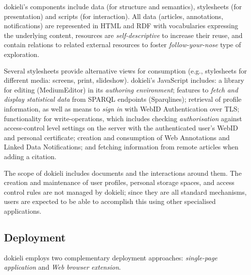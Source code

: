 \documentclass[a4paper]{llncs}
\begin{document}
                                
                                    
\par dokieli’s components include data (for structure and semantics), stylesheets (for presentation) and scripts (for interaction). All data (articles, annotations, notifications) are represented in HTML and RDF with vocabularies expressing the underlying content, resources are {\em self-descriptive} to increase their reuse, and contain relations to related external resources to foster {\em follow-your-nose} type of exploration.

                                    
\par Several stylesheets provide alternative views for consumption (e.g., stylesheets for different media: screens, print, slideshow). dokieli’s JavaScript includes: a library for editing (\empty MediumEditor) in its {\em authoring environment}; features to {\em fetch and display statistical data} from SPARQL endpoints (\empty Sparqlines); retrieval of profile information, as well as means to {\em sign in} with \empty WebID Authentication over TLS; functionality for write-operations, which includes checking {\em authorisation} against access-control level settings on the server with the authenticated user’s WebID and personal certificate; creation and consumption of \empty Web Annotations and \empty Linked Data Notifications; and fetching information from remote articles when adding a citation.

                                    
\par The scope of dokieli includes documents and the interactions around them. The creation and maintenance of user profiles, personal storage spaces, and access control rules are not managed by dokieli; since they are all standard mechanisms, users are expected to be able to accomplish this using other specialised applications.
                                
                            

                            
                                \subsection{Deployment}
  \label{deployment}

                                
                                    
\par dokieli employs two complementary deployment approaches: {\em single-page application} and {\em Web browser extension}.
\end{document}
